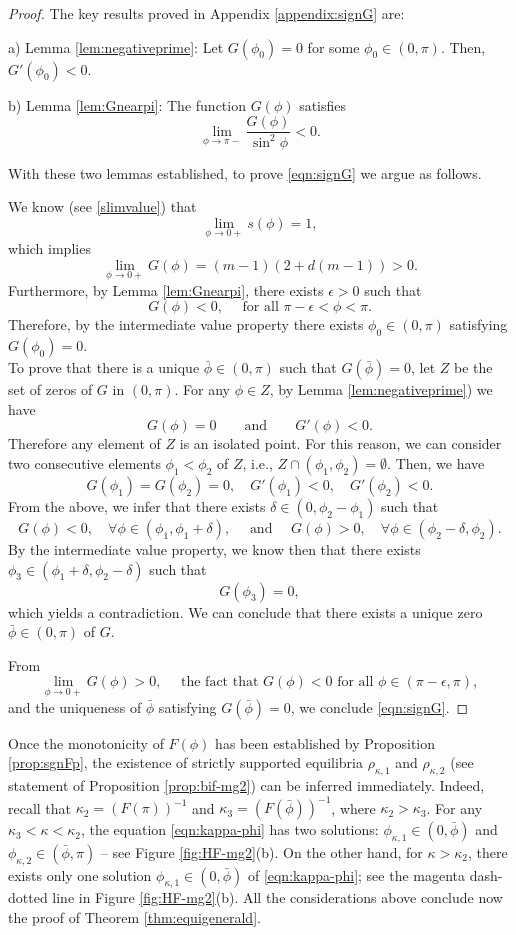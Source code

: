 \documentclass[11pt]{amsart}
\newcommand{\dm}{d} %
\begin{document}
\begin{proof}
The key results proved in Appendix \ref{appendix:signG} are:

a) Lemma \ref{lem:negativeprime}: Let $G(\phi_0)=0$ for some $\phi_0\in(0, \pi)$. Then, $G'(\phi_0)<0$.

b) Lemma \ref{lem:Gnearpi}: The function $G(\phi)$ satisfies
\[
\lim_{\phi\to\pi-}\frac{G(\phi)}{\sin^2\phi}<0.
\]

\smallskip
With these two lemmas established, to prove \eqref{eqn:signG} we argue as follows.
\smallskip

 We know (see \eqref{slimvalue}) that
\[
\lim_{\phi\to0+}s(\phi)=1,
\]
which implies
\[
\lim_{\phi\to0+}G(\phi)=(m-1)(2+\dm(m-1))>0.
\]
Furthermore, by Lemma \ref{lem:Gnearpi}, there exists $\epsilon>0$ such that
\[
G(\phi)<0, \quad \text{ for all }\pi-\epsilon<\phi<\pi.
\]
Therefore, by the intermediate value property there exists $\phi_0\in(0, \pi)$ satisfying $G(\phi_0)=0$.\\

 To prove that there is a  unique $\bar{\phi} \in (0,\pi)$ such that $G(\bar{\phi})=0$, let $Z$ be the set of zeros of $G$ in $(0,\pi)$. For any $\phi\in Z$, by Lemma \ref{lem:negativeprime}) we have
\[
G(\phi)=0\qquad\text{and}\qquad G'(\phi)<0.
\]
Therefore any element of $Z$ is an isolated point. For this reason, we can consider two consecutive elements $\phi_1 < \phi_2$ of $Z$, i.e., $Z\cap(\phi_1,\phi_2)=\emptyset$. Then, we have
\[
G(\phi_1)=G(\phi_2)=0,\quad G'(\phi_1)<0,\quad G'(\phi_2)<0.
\]
From the above, we infer that there exists $\delta\in(0, \phi_2-\phi_1)$ such that
\[
G(\phi)<0, \quad\forall \phi\in(\phi_1,\phi_1+\delta), \quad \text { and } \quad G(\phi)>0, \quad\forall \phi\in(\phi_2-\delta, \phi_2).
\]
By the intermediate value property, we know then that there exists $\phi_3\in(\phi_1+\delta, \phi_2-\delta)$ such that
\[
G(\phi_3)=0,
\]
which yields a contradiction. We can conclude that there exists a unique zero $\bar{\phi}\in(0, \pi)$ of $G$.

 From
\[
\lim_{\phi\to0+}G(\phi)>0, \quad \text{ the fact that } G(\phi)<0 \text{ for all } \phi\in(\pi-\epsilon,\pi),
\]
and the uniqueness of $\bar{\phi}$ satisfying $G(\bar{\phi})=0$, we conclude \eqref{eqn:signG}.
\end{proof}

Once the monotonicity of $F(\phi)$ has been established by Proposition \ref{prop:sgnFp}, the existence of strictly supported equilibria $\rho_{\kappa,1}$ and $\rho_{\kappa,2}$ (see statement of Proposition \ref{prop:bif-mg2}) can be inferred immediately. Indeed, recall that $\kappa_2 = (F(\pi))^{-1}$ and $\kappa_3 = (F(\bar{\phi}))^{-1}$, where $\kappa_2>\kappa_3$. For any $\kappa_3<\kappa<\kappa_2$, the equation \eqref{eqn:kappa-phi} has two solutions: $\phi_{\kappa,1} \in (0, \bar{\phi})$ and $\phi_{\kappa,2} \in (\bar{\phi},\pi)$ -- see Figure \ref{fig:HF-mg2}(b). On the other hand, for $\kappa >\kappa_2$, there exists only one solution $\phi_{\kappa,1} \in (0, \bar{\phi})$ of \eqref{eqn:kappa-phi}; see the magenta dash-dotted line in Figure \ref{fig:HF-mg2}(b). All the considerations above conclude now the proof of Theorem \ref{thm:equigenerald}.
\end{document}
